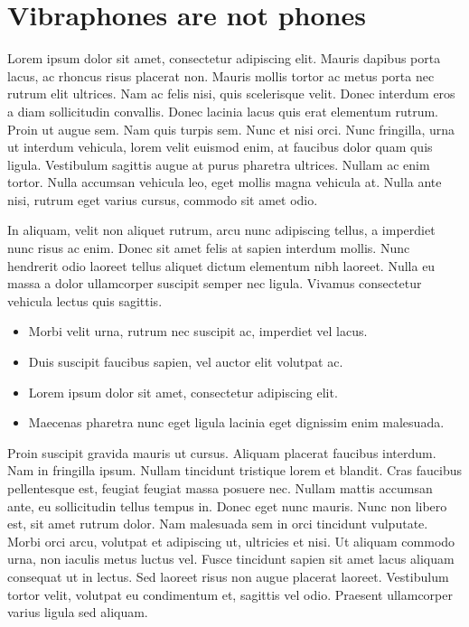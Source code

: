 \documentclass{article}
\begin{document}
\section{Vibraphones are not phones}\hypertarget{vibraphones-are-not-phones}{}\label{vibraphones-are-not-phones}

Lorem ipsum dolor sit amet, consectetur adipiscing elit. Mauris dapibus porta lacus, ac rhoncus risus placerat non. Mauris mollis tortor ac metus porta nec rutrum elit ultrices. Nam ac felis nisi, quis scelerisque velit. Donec interdum eros a diam sollicitudin convallis. Donec lacinia lacus quis erat elementum rutrum. Proin ut augue sem. Nam quis turpis sem. Nunc et nisi orci. Nunc fringilla, urna ut interdum vehicula, lorem velit euismod enim, at faucibus dolor quam quis ligula. Vestibulum sagittis augue at purus pharetra ultrices. Nullam ac enim tortor. Nulla accumsan vehicula leo, eget mollis magna vehicula at. Nulla ante nisi, rutrum eget varius cursus, commodo sit amet odio.

In aliquam, velit non aliquet rutrum, arcu nunc adipiscing tellus, a imperdiet nunc risus ac enim. Donec sit amet felis at sapien interdum mollis. Nunc hendrerit odio laoreet tellus aliquet dictum elementum nibh laoreet. Nulla eu massa a dolor ullamcorper suscipit semper nec ligula. Vivamus consectetur vehicula lectus quis sagittis.

\begin{itemize}
\item Morbi velit urna, rutrum nec suscipit ac, imperdiet vel lacus.
\item Duis suscipit faucibus sapien, vel auctor elit volutpat ac.
\item Lorem ipsum dolor sit amet, consectetur adipiscing elit.
\item Maecenas pharetra nunc eget ligula lacinia eget dignissim enim malesuada.
\end{itemize}

Proin suscipit gravida mauris ut cursus. Aliquam placerat faucibus interdum. Nam in fringilla ipsum. Nullam tincidunt tristique lorem et blandit. Cras faucibus pellentesque est, feugiat feugiat massa posuere nec. Nullam mattis accumsan ante, eu sollicitudin tellus tempus in. Donec eget nunc mauris. Nunc non libero est, sit amet rutrum dolor. Nam malesuada sem in orci tincidunt vulputate. Morbi orci arcu, volutpat et adipiscing ut, ultricies et nisi. Ut aliquam commodo urna, non iaculis metus luctus vel. Fusce tincidunt sapien sit amet lacus aliquam consequat ut in lectus. Sed laoreet risus non augue placerat laoreet. Vestibulum tortor velit, volutpat eu condimentum et, sagittis vel odio. Praesent ullamcorper varius ligula sed aliquam.
\end{document}
